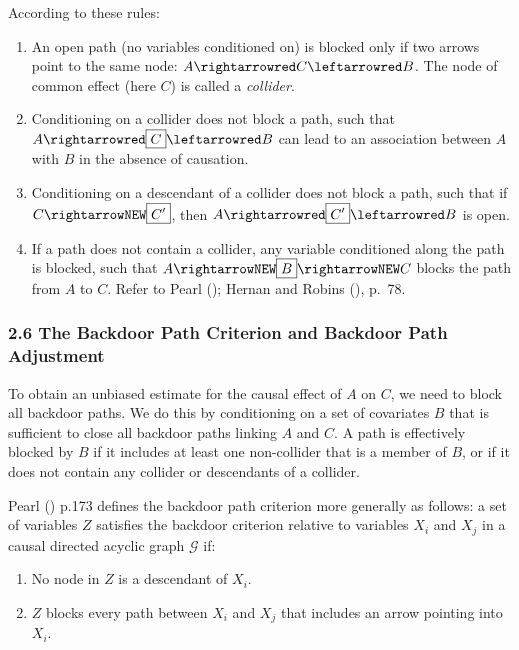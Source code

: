 \documentclass[
  single column]{article}
\providecommand{\tightlist}{%
  \setlength{\itemsep}{0pt}\setlength{\parskip}{0pt}}\usepackage{longtable,booktabs,array}
\begin{document}
According to these rules:

\begin{enumerate}
\def\labelenumi{\arabic{enumi}.}
\tightlist
\item
  An open path (no variables conditioned on) is blocked only if two
  arrows point to the same node: \(A \rightarrowred C \leftarrowred B\).
  The node of common effect (here \(C\)) is called a \emph{collider}.
\item
  Conditioning on a collider does not block a path, such that
  \(A \rightarrowred \boxed{C} \leftarrowred B\) can lead to an
  association between \(A\) with \(B\) in the absence of causation.
\item
  Conditioning on a descendant of a collider does not block a path, such
  that if \(C \rightarrowNEW \boxed{C'}\), then
  \(A \rightarrowred \boxed{C'} \leftarrowred B\) is open.
\item
  If a path does not contain a collider, any variable conditioned along
  the path is blocked, such that
  \(A \rightarrowNEW \boxed{B} \rightarrowNEW C\) blocks the path from
  \(A\) to \(C\). Refer to Pearl ();
  Hernan and Robins (), p.~78.
\end{enumerate}

\subsubsection{2.6 The Backdoor Path Criterion and Backdoor Path
Adjustment}\label{the-backdoor-path-criterion-and-backdoor-path-adjustment}

To obtain an unbiased estimate for the causal effect of \(A\) on \(C\),
we need to block all backdoor paths. We do this by conditioning on a set
of covariates \(B\) that is sufficient to close all backdoor paths
linking \(A\) and \(C\). A path is effectively blocked by \(B\) if it
includes at least one non-collider that is a member of \(B\), or if it
does not contain any collider or descendants of a collider.

Pearl () p.173 defines the backdoor path
criterion more generally as follows: a set of variables \(Z\) satisfies
the backdoor criterion relative to variables \(X_i\) and \(X_j\) in a
causal directed acyclic graph \(\mathcal{G}\) if:

\begin{enumerate}
\def\labelenumi{\arabic{enumi}.}
\tightlist
\item
  No node in \(Z\) is a descendant of \(X_i\).
\item
  \(Z\) blocks every path between \(X_i\) and \(X_j\) that includes an
  arrow pointing into \(X_i\).
\end{enumerate}
\end{document}
